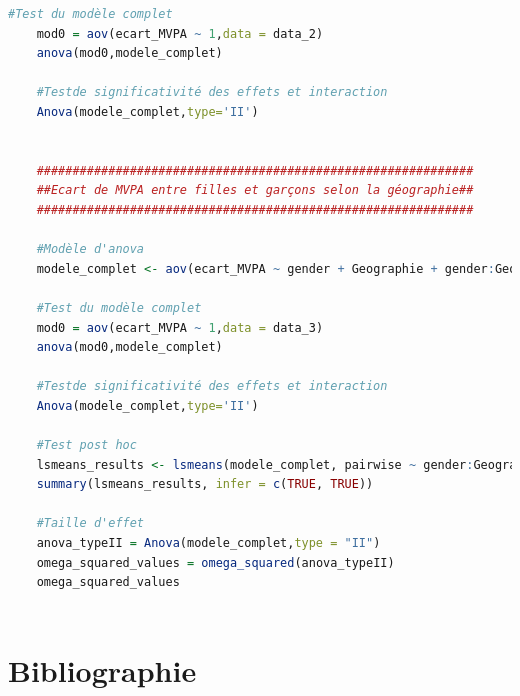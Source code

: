 \documentclass[12pt,a4paper]{article}
\begin{document}
\begin{lstlisting}[language=R]
	#Test du modèle complet
	mod0 = aov(ecart_MVPA ~ 1,data = data_2)
	anova(mod0,modele_complet)
	
	#Testde significativité des effets et interaction
	Anova(modele_complet,type='II')
	
	
	############################################################# 
	##Ecart de MVPA entre filles et garçons selon la géographie##
	#############################################################
	
	#Modèle d'anova
	modele_complet <- aov(ecart_MVPA ~ gender + Geographie + gender:Geographie,contrasts = list(gender = contr.sum,Geographie = contr.sum), data = data_3)
	
	#Test du modèle complet
	mod0 = aov(ecart_MVPA ~ 1,data = data_3)
	anova(mod0,modele_complet)
	
	#Testde significativité des effets et interaction
	Anova(modele_complet,type='II')
	
	#Test post hoc
	lsmeans_results <- lsmeans(modele_complet, pairwise ~ gender:Geographie, adjust='Tukey')
	summary(lsmeans_results, infer = c(TRUE, TRUE))
	
	#Taille d'effet
	anova_typeII = Anova(modele_complet,type = "II")
	omega_squared_values = omega_squared(anova_typeII)
	omega_squared_values
	
\end{lstlisting}
\newpage

\section*{Bibliographie}
\nocite{*}
\printbibliography[heading=none]
\end{document}
